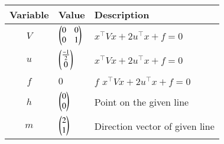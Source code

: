 \begin{tabular}{|c|p{1cm}|p{7cm}|}
    \hline
	Variable  &  Value & Description\\
    \hline
        $V$ &  $\begin{pmatrix}0&0\\0&1\end{pmatrix}$ & $x^\top Vx + 2u^\top x + f = 0$\\
    \hline
        $u$ & $\begin{pmatrix}\frac{-1}{2}\\0\end{pmatrix}$ & $x^\top Vx + 2u^\top x + f = 0$\\
    \hline
	$f$ &   $0$ & $f$ $x^\top Vx + 2u^\top x + f = 0$\\
    \hline 
	$h$ &  $\begin{pmatrix}0\\0\end{pmatrix}$ & Point on the given line\\
    \hline
        $m$ &  $\begin{pmatrix}2 \\ 1\end{pmatrix}$ & Direction vector of given line\\
    \hline	
\end{tabular}
